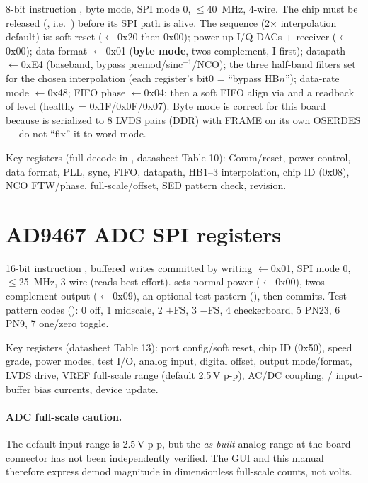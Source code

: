8-bit instruction \code{[R/W][A6:0]}, byte mode, SPI mode 0, $\le$\SI{40}{\mega\hertz},
4-wire. The chip must be released (, i.e.\ )
before its SPI path is alive. The  sequence (2$\times$
interpolation default) is: soft reset ($\leftarrow$0x20 then 0x00);
power up I/Q DACs + receiver ($\leftarrow$0x00); data format
$\leftarrow$0x01 (\textbf{byte mode}, twos-complement, I-first);
datapath $\leftarrow$0xE4 (baseband, bypass premod/sinc$^{-1}$/NCO);
the three half-band filters  set for the chosen
interpolation (each register's bit0 = ``bypass HB$n$''); data-rate mode
$\leftarrow$0x48; FIFO phase $\leftarrow$0x04; then a soft
FIFO align via  and a readback of level  (healthy =
0x1F/0x0F/0x07). Byte mode is correct for this board because 
is serialized to 8 LVDS pairs (DDR) with FRAME on its own OSERDES --- do not
``fix'' it to word mode.

Key registers (full decode in , datasheet Table 10):
 Comm/reset,  power control,  data format,
 PLL,  sync,  FIFO,
 datapath,  HB1--3 interpolation,  chip
ID (0x08),  NCO FTW/phase,  full-scale/offset,
 SED pattern check,  revision.

\section{AD9467 ADC SPI registers}
\label{sec:adc-regs}

16-bit instruction \code{[R/W][W1][W0][A12:0]}, buffered writes committed by
writing $\leftarrow$0x01, SPI mode 0, $\le$\SI{25}{\mega\hertz},
3-wire (reads best-effort).  sets normal power
($\leftarrow$0x00), twos-complement output
($\leftarrow$0x09), an optional test pattern (), then
commits. Test-pattern codes (): 0 off, 1 midscale, 2 $+$FS,
3 $-$FS, 4 checkerboard, 5 PN23, 6 PN9, 7 one/zero toggle.

Key registers (datasheet Table 13):  port config/soft reset,
 chip ID (0x50),  speed grade,  power modes,
 test I/O,  analog input,  digital offset,
 output mode/format,  LVDS drive,  VREF
full-scale range (default 2.5\,V p-p),  AC/DC coupling,
/ input-buffer bias currents,  device update.

\paragraph{ADC full-scale caution.} The default input range is 2.5\,V p-p, but
the \emph{as-built} analog range at the board connector has not been
independently verified. The GUI and this manual therefore express demod
magnitude in dimensionless full-scale counts, not volts.

